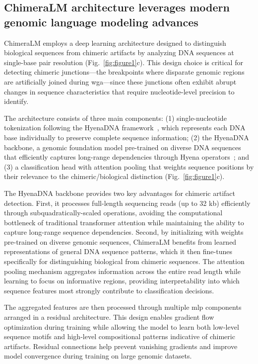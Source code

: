 \documentclass[pdflatex,sn-nature]{sn-jnl}%
\theoremstyle{thmstyleone}%
\theoremstyle{thmstyletwo}%
\theoremstyle{thmstylethree}%
\begin{document}
\subsection*{ChimeraLM architecture leverages modern genomic language modeling advances}

ChimeraLM employs a deep learning architecture designed to distinguish biological sequences from chimeric artifacts by analyzing DNA sequences at single-base pair resolution (Fig.~\ref{fig:figure1}c).
This design choice is critical for detecting chimeric junctions---the breakpoints where disparate genomic regions are artificially joined during \gls{wga}---since these junctions often exhibit abrupt changes in sequence characteristics that require nucleotide-level precision to identify.

The architecture consists of three main components: (1) single-nucleotide tokenization following the HyenaDNA framework~\cite{nguyen2023hyenadna}, which represents each DNA base individually to preserve complete sequence information; (2) the HyenaDNA backbone, a genomic foundation model pre-trained on diverse DNA sequences that efficiently captures long-range dependencies through Hyena operators~\cite{Poli2023HyenaHT}; and (3) a classification head with attention pooling that weights sequence positions by their relevance to the chimeric/biological distinction (Fig.~\ref{fig:figure1}c).

The HyenaDNA backbone provides two key advantages for chimeric artifact detection.
First, it processes full-length sequencing reads (up to 32 kb) efficiently through subquadratically-scaled operations, avoiding the computational bottleneck of traditional transformer attention while maintaining the ability to capture long-range sequence dependencies.
Second, by initializing with weights pre-trained on diverse genomic sequences, ChimeraLM benefits from learned representations of general DNA sequence patterns, which it then fine-tunes specifically for distinguishing biological from chimeric sequences.
The attention pooling mechanism aggregates information across the entire read length while learning to focus on informative regions, providing interpretability into which sequence features most strongly contribute to classification decisions.

The aggregated features are then processed through multiple \gls{mlp} components arranged in a residual architecture.
This design enables gradient flow optimization during training while allowing the model to learn both low-level sequence motifs and high-level compositional patterns indicative of chimeric artifacts.
Residual connections help prevent vanishing gradients and improve model convergence during training on large genomic datasets.
\end{document}
